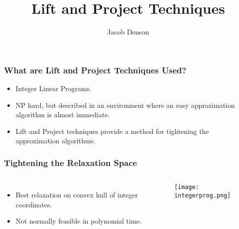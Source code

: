 \documentclass{beamer}
\title{Lift and Project Techniques}
\author{Jacob Denson}
\institute{University of Alberta}
\begin{document}
\maketitle

\begin{frame}
    \frametitle{What are Lift and Project Techniques Used?}

    \begin{itemize}
        \item Integer Linear Programs.
        \item NP hard, but described in an environment where an easy approximation algorithm is almost immediate.
        \item Lift and Project techniques provide a method for tightening the approximation algorithms.
    \end{itemize}
\end{frame}

\begin{frame}
    \frametitle{Tightening the Relaxation Space}

    \begin{columns}

        \begin{itemize}
            \item Best relaxation on convex hull of integer coordinates.
            \item Not normally feasible in polynomial time.
        \end{itemize}

        \begin{center}
        \texttt{[image: integerprog.png]}
        \end{center}

    \end{columns}
\end{frame}
\end{document}
